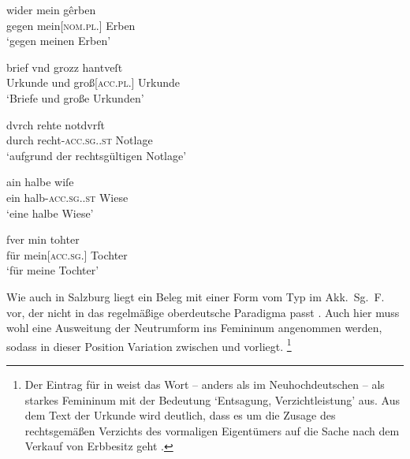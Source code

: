 \begin{exe}
\ex \label{ex:adjwienapo}
	\begin{xlist}
	\ex \label{ex:adjwienregel_1}
		\gll wider mein gêrben \\
			gegen mein[\textsc{nom.pl.\MascM}] Erben \\
		\trans `gegen meinen Erben'
			\parencites(Nr.~N~263, Wien, 1284)[210,24]{cao5}

	\ex \label{ex:adjwienregel_2}
		\gll brief vnd grozz hantveſt \\
			Urkunde und groß[\textsc{acc.pl.\FemI}] Urkunde \\
		\trans `Briefe und große Urkunden'
			\parencites(Nr.~67, Stift~Heiligenkreuz, Bz.~Baden, 1263)[103,21]{cao1}
	\end{xlist}

\ex \label{ex:adjwienakksgf}
	\begin{xlist}
	\ex \label{ex:adjwienakksgf_1}
		\gll dvrch rehte notdvrft \\
			durch recht-\textsc{acc.sg.\FemI.st} Notlage \\
		\trans `aufgrund der rechtsgültigen Notlage'
			\parencites(Nr.~2966, Wien, 1298)[243,3]{cao4}

	\ex \label{ex:adjwienakksgf_2}
		\gll ain halbe wiſe \\
			ein halb-\textsc{acc.sg.\FemI.st} Wiese \\
		\trans `eine halbe Wiese'
			\parencites(Nr.~N~718, Wien, 1295)[518,5]{cao5}
	
	\ex \label{ex:adjwienakksgf_3}
		\gll fver min tohter \\
			für mein[\textsc{acc.sg.\FemF}] Tochter \\
		\trans `für meine Tochter'
			\parencites(Nr.~1578, Wien, 1292)[724,6]{cao2}
	\end{xlist}
\end{exe}

Wie auch in Salzburg liegt ein Beleg mit einer Form vom Typ  im
Akk.~Sg.~F. vor, der nicht in das regelmäßige oberdeutsche
Paradigma passt . Auch hier muss wohl eine Ausweitung
der Neutrumform ins Femininum angenommen werden, sodass in dieser Position
Variation zwischen  und  vorliegt.%
%
	\footnote{Der Eintrag für  in \citet{lexer:mhdhwb} weist das
		Wort -- anders als im Neuhochdeutschen -- als
		starkes Femininum mit der Bedeutung `Entsagung, Verzichtleistung' aus.
		Aus dem Text der Urkunde wird deutlich, dass es um die Zusage des
		rechtsgemäßen Verzichts des vormaligen Eigentümers auf die Sache nach
		dem Verkauf von Erbbesitz geht \autocite[vgl.~%
		auch][506]{caor}.}

